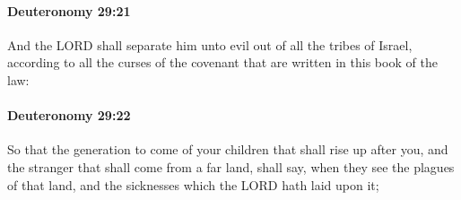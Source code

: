 		\paragraph{Deuteronomy 29:21} %
			\label{DEUTERONOMY-29-21}

			And the LORD shall separate him unto evil out of all the tribes of Israel, according to all the curses of the covenant that are written in this book of the law:


		\paragraph{Deuteronomy 29:22} %
			\label{DEUTERONOMY-29-22}

			So that the generation to come of your children that shall rise up after you, and the stranger that shall come from a far land, shall say, when they see the plagues of that land, and the sicknesses which the LORD hath laid upon it;


